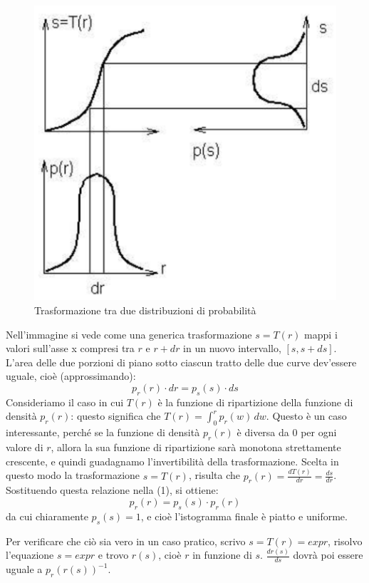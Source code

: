 \documentclass[a4paper,11pt]{article}
\begin{document}
\newpage
\renewcommand{\thefigure}{5.15}
\begin{figure}[!h]
  \centering
    \includegraphics[scale=0.4]{images/5/densities.png}
    \caption{Trasformazione tra due distribuzioni di probabilità}
\end{figure}

Nell'immagine si vede come una generica trasformazione $s=T(r)$ mappi i valori sull'asse x compresi tra $r$ e $r+dr$ in un nuovo intervallo,
$[s, s+ds]$. L'area delle due porzioni di piano sotto ciascun tratto delle due curve dev'essere uguale, cioè (approssimando):
\begin{equation}
p_r(r)\cdot dr = p_s(s) \cdot ds
\end{equation}
Consideriamo il caso in cui $T(r)$ è la funzione di ripartizione della funzione di densità $p_r(r)$: questo significa che $T(r) = \int_{0}^{r} p_r(w) \,dw$.
Questo è un caso interessante, perché se la funzione di densità $p_r(r)$ è diversa da 0 per ogni valore di $r$, allora la sua funzione di ripartizione
sarà monotona strettamente crescente, e quindi guadagnamo l'invertibilità della trasformazione.
Scelta in questo modo la trasformazione $s = T(r)$, risulta che $p_r(r) = \frac{dT(r)}{dr} = \frac{ds}{dr}$. Sostituendo questa relazione nella (1),
si ottiene:
\begin{equation}
    p_r(r) = p_s(s) \cdot p_r(r)
\end{equation}
da cui chiaramente $p_s(s) = 1$, e cioè l'istogramma finale è piatto e uniforme.
\par
Per verificare che ciò sia vero in un caso pratico, scrivo $s = T(r) = expr$, risolvo l'equazione $s = expr$ e trovo $r(s)$, cioè $r$ in funzione di $s$.
$\frac{dr(s)}{ds}$ dovrà poi essere uguale a $p_r(r(s))^{-1}$.
\end{document}

